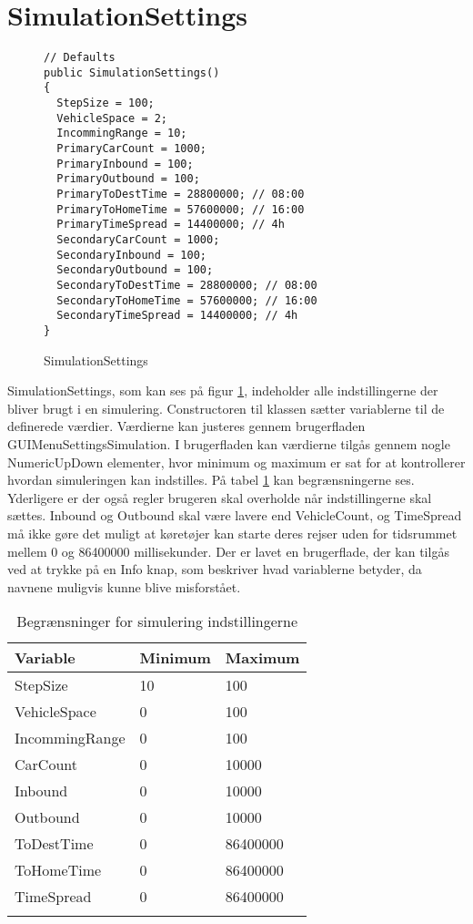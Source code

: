 \section{SimulationSettings}
\begin{figure}[H]
\begin{lstlisting} 
// Defaults
public SimulationSettings()
{
  StepSize = 100;
  VehicleSpace = 2;
  IncommingRange = 10;
  PrimaryCarCount = 1000;
  PrimaryInbound = 100;
  PrimaryOutbound = 100;
  PrimaryToDestTime = 28800000; // 08:00
  PrimaryToHomeTime = 57600000; // 16:00
  PrimaryTimeSpread = 14400000; // 4h
  SecondaryCarCount = 1000;
  SecondaryInbound = 100;
  SecondaryOutbound = 100;
  SecondaryToDestTime = 28800000; // 08:00
  SecondaryToHomeTime = 57600000; // 16:00
  SecondaryTimeSpread = 14400000; // 4h
}
\end{lstlisting}
\caption{SimulationSettings}\label{SimulationSettings}
\end{figure}

SimulationSettings, som kan ses på figur \ref{SimulationSettings}, indeholder alle indstillingerne der bliver brugt i en simulering. Constructoren til klassen sætter variablerne til de definerede værdier. Værdierne kan justeres gennem brugerfladen GUIMenuSettingsSimulation. I brugerfladen kan værdierne tilgås gennem nogle NumericUpDown elementer, hvor minimum og maximum er sat for at kontrollerer hvordan simuleringen kan indstilles. På tabel \ref{SimulationLimits} kan begrænsningerne ses. Yderligere er der også regler brugeren skal overholde når indstillingerne skal sættes. Inbound og Outbound skal være lavere end VehicleCount, og TimeSpread må ikke gøre det muligt at køretøjer kan starte deres rejser uden for tidsrummet mellem 0 og 86400000 millisekunder. Der er lavet en brugerflade, der kan tilgås ved at trykke på en Info knap, som beskriver hvad variablerne betyder, da navnene muligvis kunne blive misforstået.

\begin{table}[]
\centering
\begin{tabular}{|l|l|l|}
\hline
Variable       & Minimum & Maximum  \\ \hline
StepSize       & 10      & 100      \\ \hline
VehicleSpace   & 0       & 100      \\ \hline
IncommingRange & 0       & 100      \\ \hline
CarCount       & 0       & 10000    \\ \hline
Inbound        & 0       & 10000    \\ \hline
Outbound       & 0       & 10000    \\ \hline
ToDestTime     & 0       & 86400000 \\ \hline
ToHomeTime     & 0       & 86400000 \\ \hline
TimeSpread     & 0       & 86400000 \\ \hline
\caption{Begrænsninger for simulering indstillingerne}
\label{SimulationLimits}
\end{tabular}
\end{table}

